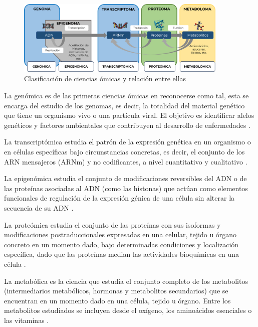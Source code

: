 \begin{figure}[h!]
    \centering
    \includegraphics[width=0.9\textwidth]{Imagenes/Tip_omic.png}
    \caption{Clasificación de ciencias ómicas y relación entre ellas}
    \label{fig:tip_omic}
\end{figure}



La genómica es de las primeras ciencias ómicas en reconocerse como tal, esta se encarga del estudio de los genomas, es decir, la totalidad del material genético que tiene un organismo vivo o una partícula viral. El objetivo es identificar alelos genéticos y factores ambientales que contribuyen al desarrollo de enfermedades \citep{institute}.

La transcriptómica estudia el patrón de la expresión genética en un organismo o en células específicas bajo circunstancias concretas, es decir, el conjunto de los ARN mensajeros (ARNm) y no codificantes, a nivel cuantitativo y cualitativo \citep{davis2017missing}.

La epigenómica estudia el conjunto de modificaciones reversibles del ADN o de las proteínas asociadas al ADN (como las histonas) que actúan como elementos funcionales de regulación de la expresión génica de una célula sin alterar la secuencia de su ADN \citep{hasin2017multi}.

La proteómica estudia el conjunto de las proteínas con sus isoformas y modificaciones postraduccionales expresadas en una celular, tejido u órgano concreto en un momento dado, bajo determinadas condiciones y localización específica, dado que las proteínas median las actividades bioquímicas en una célula \citep{van2018precision}.

La metabólica es la ciencia que estudia el conjunto completo de los metabolitos (intermediarios metabólicos, hormonas y metabolitos secundarios) que se encuentran en un momento dado en una célula, tejido u órgano. Entre los metabolitos estudiados se incluyen desde el oxígeno, los aminoácidos esenciales o las vitaminas \citep{zhao2014lipidomics}.

